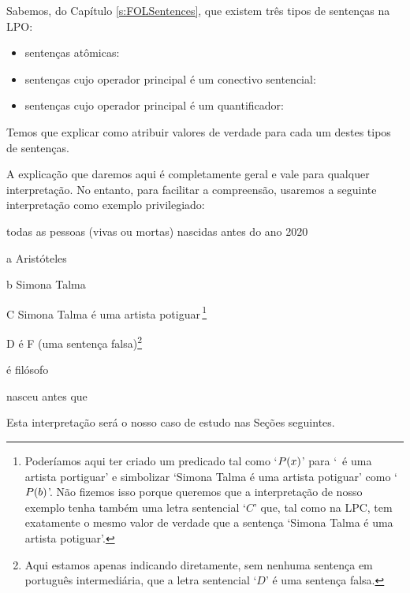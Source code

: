 Sabemos, do Capítulo \ref{s:FOLSentences}, que existem três tipos de sentenças na LPO:
	\begin{itemize}
		\item sentenças atômicas:
		\item sentenças cujo operador principal é um conectivo sentencial:
		\item sentenças cujo operador principal é um quantificador:
	\end{itemize}
Temos que explicar como atribuir valores de verdade para cada um destes tipos de sentenças.

A explicação que daremos aqui é completamente geral e vale para qualquer interpretação.
No entanto, para facilitar a compreensão, usaremos a seguinte interpretação como exemplo privilegiado:
\begin{center}\label{i:Sample}
	\begin{ekey}
		\item[\text{domínio}] {\small todas as pessoas (vivas ou mortas) nascidas antes do ano 2020}
		\item[a] {\small Aristóteles}
		\item[b] {\small Simona Talma}
		\item[C] {\small Simona Talma é uma artista potiguar\,}\footnote{
			Poderíamos aqui ter criado um predicado tal como `$\mathord{P}(x)$' para `~é uma artista portiguar' e simbolizar `Simona Talma é uma artista potiguar' como `$\mathord{P}(b)$'.
			Não fizemos isso porque queremos que a interpretação de nosso exemplo tenha também uma letra sentencial `$C$' que, tal  como na LPC, tem exatamente o mesmo valor de verdade que a sentença `Simona Talma é uma artista potiguar'.}
		\item[D] {\small é F (uma sentença falsa)}\footnote{
			Aqui estamos apenas indicando diretamente, sem nenhuma sentença em português intermediária, que a letra sentencial `$D$' é uma sentença falsa.}
		\item[\atom{F}{x}]  {\small é filósofo}
		\item[\atom{R}{x,y}]  {\small nasceu antes que} 
	\end{ekey}
\end{center}
Esta interpretação será o nosso caso de estudo nas Seções seguintes.


